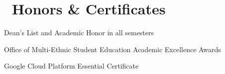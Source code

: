 \documentclass{resume}
\begin{document}
    \clearpage

    \section{\faHeartO\ Honors \& Certificates}
    \begin{myitemize}
        \item Dean's List and Academic Honor in all semesters
        \item Office of Multi-Ethnic Student Education Academic Excellence Awards
        \item Google Cloud Platform Essential Certificate
    \end{myitemize}
\end{document}
